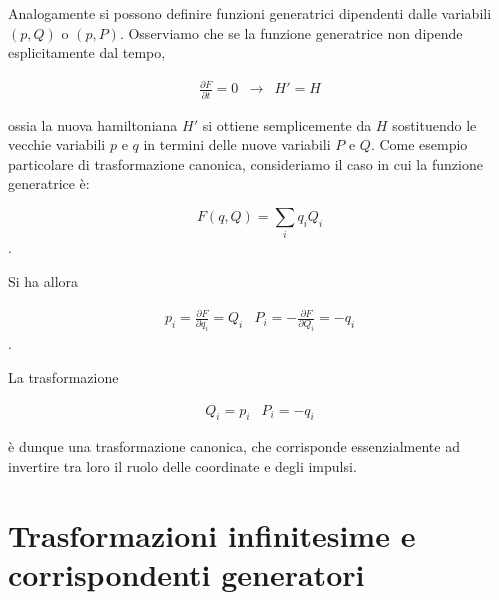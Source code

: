 \documentclass[a4paper,12pt,oneside]{book}
\begin{document}
Analogamente si possono definire funzioni generatrici dipendenti dalle variabili $(p,Q)$ o $(p,P)$.
Osserviamo che se la funzione generatrice non dipende esplicitamente dal tempo,

\begin{equation}
\begin{matrix}

\frac{\partial F}{\partial t} = 0 & \rightarrow & H' = H

\end{matrix}
\end{equation}

ossia la nuova hamiltoniana $H'$ si ottiene semplicemente da $H$ sostituendo le vecchie variabili $p$ e $q$ in termini delle nuove variabili $P$ e $Q$.
Come esempio particolare di trasformazione canonica, consideriamo il caso in cui la funzione generatrice \`e:

\begin{equation}
F(q,Q) = \sum_i q_i Q_i
\end{equation}.

Si ha allora

\begin{equation}
\begin{matrix}

p_i = \frac{\partial F}{\partial q_i} = Q_i & P_i = - \frac{\partial F}{\partial Q_i} = -q_i

\end{matrix}
\end{equation}.

La trasformazione

\begin{equation}
\begin{matrix}
Q_i = p_i & P_i = -q_i
\end{matrix}
\end{equation}

\`e dunque una trasformazione canonica, che corrisponde essenzialmente ad invertire tra loro il ruolo delle coordinate e degli impulsi.

\section{Trasformazioni infinitesime e corrispondenti generatori}
\end{document}
